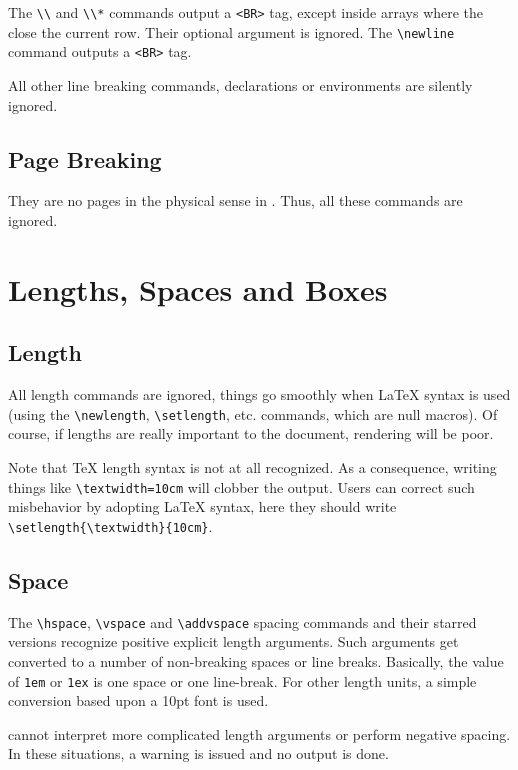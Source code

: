 The \verb+\\+ and \verb+\\*+ commands output a \verb+<BR>+ tag,
except inside arrays where the close the current row.
Their optional argument is ignored.
The \verb+\newline+ command outputs a \verb+<BR>+ tag.

All other line breaking commands, declarations or environments are
silently ignored.

\subsection{Page Breaking}
They are no pages in the physical sense in \html. Thus, all these
commands are ignored.

\section{Lengths, Spaces and Boxes}

\subsection{Length}

All length commands are ignored, things go smoothly when \LaTeX{} syntax is
used (using the \verb+\newlength+, \verb+\setlength+, etc. commands,
which are null macros).
Of course, if lengths are really important to the document, rendering
will be poor.

Note that \TeX{} length syntax is not at all recognized. As a
consequence, writing things like \verb+\textwidth=10cm+ will clobber
the output.
Users can correct such misbehavior by adopting \LaTeX{} syntax, here
they should write
\verb+\setlength{\textwidth}{10cm}+.


\subsection{Space}
The \verb+\hspace+, \verb+\vspace+ and \verb+\addvspace+ spacing
commands and their starred versions recognize positive explicit length
arguments.  Such arguments get converted to a number of non-breaking
spaces or line breaks.
Basically, the value of \verb+1em+ or \verb+1ex+ is one space or one
line-break. For other length units, a simple conversion based upon a
10pt font is used.


\hevea{} cannot interpret more complicated length arguments
or perform negative spacing.
In these situations, a warning is issued and no output is done.

